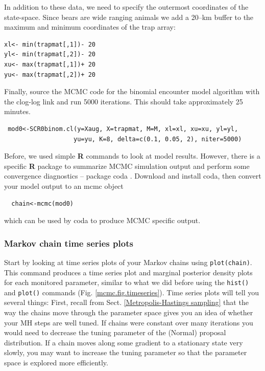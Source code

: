  In addition to these data, we need to specify 
the outermost coordinates of the state-space. Since bears are wide 
ranging animals we add a 20--km buffer to the maximum and minimum 
coordinates of the trap array:

\begin{verbatim}
xl<- min(trapmat[,1])- 20  
yl<- min(trapmat[,2])- 20 
xu<- max(trapmat[,1])+ 20
yu<- max(trapmat[,2])+ 20
\end{verbatim}

Finally, source the MCMC code for the binomial encounter model algorithm 
with the clog-log link and run 5000 iterations. This should take 
approximately 25 minutes.
\begin{verbatim}
 mod0<-SCR0binom.cl(y=Xaug, X=trapmat, M=M, xl=xl, xu=xu, yl=yl, 
                   yu=yu, K=8, delta=c(0.1, 0.05, 2), niter=5000)
\end{verbatim}

Before, we used simple {\bf R} commands to look at model results. 
However, there is a specific {\bf R} package to summarize MCMC 
simulation output and perform some convergence diagnostics -- package 
coda \citep{plummer_etal:2006}. Download and install coda, then 
convert your model output to an mcmc object
\begin{verbatim}
  chain<-mcmc(mod0)
\end{verbatim} 
which can be used by coda to produce MCMC specific output.

\subsubsection{Markov chain time series plots}

Start by looking at time series plots of your Markov chains using 
\verb#plot(chain)#. This command produces a time series plot and
 marginal posterior density plots for each monitored parameter, 
 similar to what we did before using the \verb#hist()# and \verb#plot()# 
 commands (Fig. \ref{mcmc.fig.timeseries}). Time series plots will tell 
 you several things:
First, recall from Sect. \ref{Metropolis-Hastings sampling} that the way the chains move 
through the parameter space gives you an idea of whether your MH 
steps are well tuned. If chains were constant over many iterations 
you would need to decrease the tuning parameter of the (Normal) 
proposal distribution. If a chain moves along some gradient to a 
stationary state very slowly, you may want to increase the tuning 
parameter so that the parameter space is explored more efficiently.


